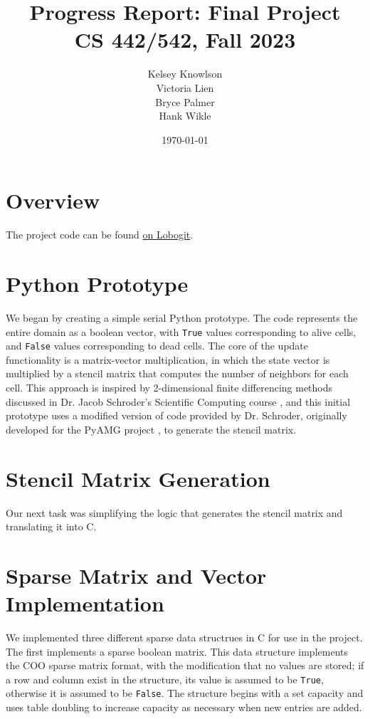 \documentclass[12pt]{article}
\title{Progress Report: Final Project \\ CS 442/542, Fall 2023}
\author{
        Kelsey Knowlson \\
        Victoria Lien \\ 
        Bryce Palmer \\
        Hank Wikle
}
\date{\today}   %
\begin{document}
\maketitle
\clearpage

\section{Overview}

The project code can be found \href{https://lobogit.unm.edu/hwikle/game-of-life}{on Lobogit}.

\section{Python Prototype}

We began by creating a simple serial Python prototype. The code represents the entire domain as a boolean vector, with \texttt{True} values corresponding to alive cells, and \texttt{False} values corresponding to dead cells. The core of the update functionality is a matrix-vector multiplication, in which the state vector is multiplied by a stencil matrix that computes the number of neighbors for each cell. This approach is inspired by 2-dimensional finite differencing methods discussed in Dr. Jacob Schroder's Scientific Computing course \cite{cs471}, and this initial prototype uses a modified version of code provided by Dr. Schroder, originally developed for the PyAMG project \cite{pyamg2023}, to generate the stencil matrix.

\section{Stencil Matrix Generation}

Our next task was simplifying the logic that generates the stencil matrix and translating it into C.

\section{Sparse Matrix and Vector Implementation}

We implemented three different sparse data structrues in C for use in the project. The first implements a sparse boolean matrix. This data structure implements the COO sparse matrix format, with the modification that no values are stored; if a row and column exist in the structure, its value is assumed to be \texttt{True}, otherwise it is assumed to be \texttt{False}. The structure begins with a set capacity and uses table doubling \cite{mit} to increase capacity as necessary when new entries are added. \\
\end{document}
